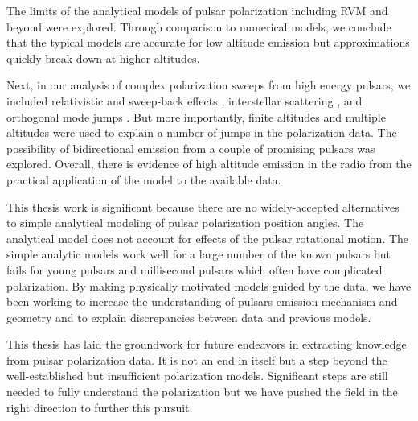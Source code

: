 The limits of 
the analytical models of pulsar polarization including
RVM and beyond were explored.
Through comparison to numerical models, we conclude
that the typical models are
accurate for low altitude emission but
approximations quickly break down at higher altitudes.

Next, in our analysis of complex polarization sweeps from 
high energy pulsars, we included relativistic and
sweep-back effects \citep{romani2010constraining}, 
interstellar scattering \citep{cronyn1970analysis}, 
and orthogonal mode jumps \citep{backer1976orthogonal}. But more
importantly, finite altitudes and multiple altitudes were used to explain a number
of jumps in the polarization data.
The possibility of bidirectional emission from a couple of 
promising pulsars was explored. Overall, there is evidence of high altitude
emission in the radio from the practical application
of the model to the available data.

This thesis work is significant because there are no widely-accepted
alternatives to simple analytical modeling of pulsar polarization position
angles. The analytical model does not
account for effects of the pulsar rotational motion. The simple analytic models
work well for a large number of the known pulsars but fails for young pulsars
and millisecond pulsars which often have complicated polarization. By making
physically motivated models guided by the data, we have been working to
increase the understanding of pulsars emission mechanism and geometry and to
explain discrepancies between data and previous models.


This thesis has laid the groundwork for future endeavors
in extracting knowledge from pulsar polarization data.  It is not an end in
itself but a step beyond the well-established but insufficient
polarization models. Significant steps are still needed
to fully understand the polarization but we have
pushed the field in the right direction to further
this pursuit.


